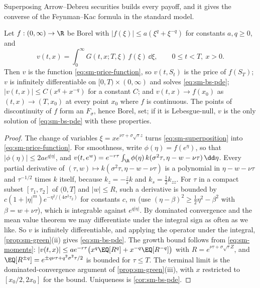 Superposing Arrow--Debreu securities builds every payoff, and it gives the converse of the
Feynman--Kac formula in the standard model.

\begin{corollary}\label{cor:sm-superposition}
Let $f:(0,\infty)\to\R$ be Borel with $|f(\xi)|\le a(\xi^q+\xi^{-q})$ for constants $a,q\ge0$, and
\begin{equation}\label{eq:sm-superposition}
  v(t,x)=\int_0^\infty G(t,x;T,\xi)\,f(\xi)\,\dd\xi,\qquad 0\le t<T,\ x>0 .
\end{equation}
Then $v$ is the function \eqref{eq:sm-price-function}, so $v(t,S_t)$ is the price of $f(S_T)$;
$v$ is infinitely differentiable on $[0,T)\times(0,\infty)$ and solves \eqref{eq:sm-bs-pde};
$|v(t,x)|\le C(x^q+x^{-q})$ for a constant $C$; and $v(t,x)\to f(x_0)$ as $(t,x)\to(T,x_0)$ at every
point $x_0$ where $f$ is continuous. The points of discontinuity of $f$ form an $F_\sigma$, hence
Borel, set; if it is Lebesgue-null, $v$ is the only solution of \eqref{eq:sm-bs-pde} with these
properties.
\end{corollary}

\begin{proof}
The change of variables $\xi=xe^{\nu\tau+\sigma\sqrt\tau z}$ turns \eqref{eq:sm-superposition} into
\eqref{eq:sm-price-function}. For smoothness, write $\phi(\eta)=f(e^\eta)$, so that
$|\phi(\eta)|\le2ae^{q|\eta|}$, and $v(t,e^w)=e^{-r\tau}\int_\R\phi(\eta)\,k(\sigma^2\tau,\eta-w-\nu\tau)\,\dd\eta$.
Every partial derivative of $(\tau,w)\mapsto k(\sigma^2\tau,\eta-w-\nu\tau)$ is a polynomial in
$\eta-w-\nu\tau$ and $\tau^{-1/2}$ times $k$ itself, because $k_z=-\frac zsk$ and
$k_s=\frac12k_{zz}$. For $\tau$ in a compact subset $[\tau_1,\tau_2]$ of $(0,T]$ and $|w|\le R$, such a
derivative is bounded by $c(1+|\eta|^m)e^{-\eta^2/(4\sigma^2\tau_2)}$ for constants $c$, $m$
(use $(\eta-\beta)^2\ge\frac12\eta^2-\beta^2$ with $\beta=w+\nu\tau$), which is integrable against
$e^{q|\eta|}$. By dominated convergence and the mean value theorem we may differentiate under the
integral sign as often as we like. So $v$ is infinitely differentiable, and applying the
operator under the integral, \cref{prop:sm-green}(ii) gives \eqref{eq:sm-bs-pde}. The growth bound
follows from \eqref{eq:sm-moments}: $|v(t,x)|\le ae^{-r\tau}\big(x^q\EQ[R^q]+x^{-q}\EQ[R^{-q}]\big)$ with
$R=e^{\nu\tau+\sigma\sqrt\tau Z}$, and $\EQ[R^{\pm q}]=e^{\pm q\nu\tau+q^2\sigma^2\tau/2}$ is bounded for
$\tau\le T$. The terminal limit is the dominated-convergence argument of \cref{prop:sm-green}(iii),
with $x$ restricted to $[x_0/2,2x_0]$ for the bound. Uniqueness is \cref{cor:sm-bs-pde}.
\end{proof}

